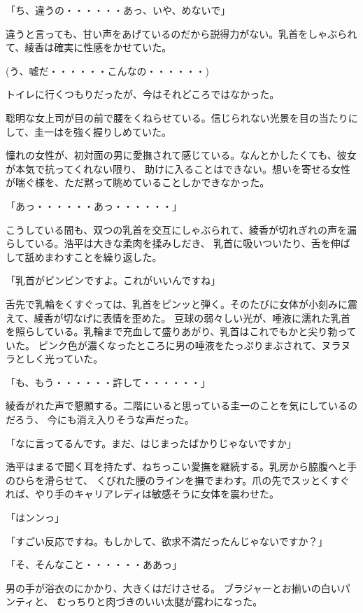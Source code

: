 ﻿\documentclass[book,tate]{jlreq}
\begin{document}
「ち、違うの・・・・・・あっ、いや、めないで」

違うと言っても、甘い声をあげているのだから説得力がない。乳首をしゃぶられて、綾香は確実に性感をかせていた。

(う、嘘だ・・・・・・こんなの・・・・・・)

トイレに行くつもりだったが、今はそれどころではなかった。

聡明な女上司が目の前で腰をくねらせている。信じられない光景を目の当たりにして、圭一はを強く握りしめていた。

憧れの女性が、初対面の男に愛撫されて感じている。なんとかしたくても、彼女が本気で抗ってくれない限り、
助けに入ることはできない。想いを寄せる女性が喘ぐ様を、ただ黙って眺めていることしかできなかった。

「あっ・・・・・・あっ・・・・・・」

こうしている間も、双つの乳首を交互にしゃぶられて、綾香が切れぎれの声を漏らしている。浩平は大きな柔肉を揉みしだき、
乳首に吸いついたり、舌を伸ばして舐めまわすことを繰り返した。

「乳首がビンビンですよ。これがいいんですね」

舌先で乳輪をくすぐっては、乳首をピンッと弾く。そのたびに女体が小刻みに震えて、綾香が切なげに表情を歪めた。
豆球の弱々しい光が、唾液に濡れた乳首を照らしている。乳輪まで充血して盛りあがり、乳首はこれでもかと尖り勃っていた。
ピンク色が濃くなったところに男の唾液をたっぷりまぶされて、ヌラヌラとしく光っていた。

「も、もう・・・・・・許して・・・・・・」

綾香がれた声で懇願する。二階にいると思っている圭一のことを気にしているのだろう、
今にも消え入りそうな声だった。

「なに言ってるんです。まだ、はじまったばかりじゃないですか」

浩平はまるで聞く耳を持たず、ねちっこい愛撫を継続する。乳房から脇腹へと手のひらを滑らせて、
くびれた腰のラインを撫でまわす。爪の先でスッとくすぐれば、やり手のキャリアレディは敏感そうに女体を震わせた。

「はンンっ」

「すごい反応ですね。もしかして、欲求不満だったんじゃないですか？」

「そ、そんなこと・・・・・・ああっ」

男の手が浴衣のにかかり、大きくはだけさせる。 ブラジャーとお揃いの白いパンティと、
むっちりと肉づきのいい太腿が露わになった。
\end{document}

